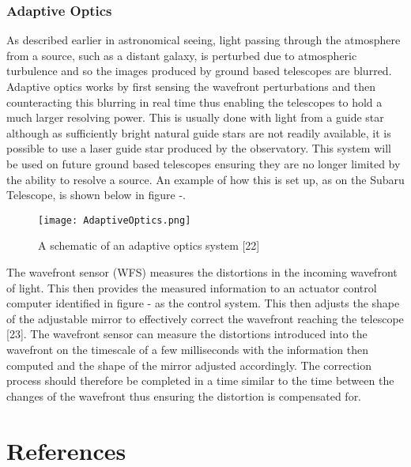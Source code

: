 \documentclass[pdf,color]{UoBnote}
\begin{document}
\subsubsection{Adaptive Optics}
As described earlier in astronomical seeing, light passing through the atmosphere from a source, such as a distant galaxy, is perturbed due to atmospheric turbulence and so the images produced by ground based telescopes are blurred. Adaptive optics works by first sensing the wavefront perturbations and then counteracting this blurring in real time thus enabling the telescopes to hold a much larger resolving power. This is usually done with light from a guide star although as sufficiently bright natural guide stars are not readily available, it is possible to use a laser guide star produced by the observatory. This system will be used on future ground based telescopes ensuring they are no longer limited by the ability to resolve a source. An example of how this is set up, as on the Subaru Telescope, is shown below in figure -. \\
\newline
\newline
\begin{figure}[H]
\begin{center}
\texttt{[image: AdaptiveOptics.png]}
\end{center}
\caption{A schematic of an adaptive optics system [22]}\label{fig:figure1}
\end{figure}
\noindent
The wavefront sensor (WFS) measures the distortions in the incoming wavefront of light. This then provides the measured information to an actuator control computer identified in figure - as the control system. This then adjusts the shape of the adjustable mirror to effectively correct the wavefront reaching the telescope [23].  The wavefront sensor can measure the distortions introduced into the wavefront on the timescale of a few milliseconds with the information then computed and the shape of the mirror adjusted accordingly. The correction process should therefore be completed in a time similar to the time between the changes of the wavefront thus ensuring the distortion is compensated for.\\

\section{References}
\end{document}
